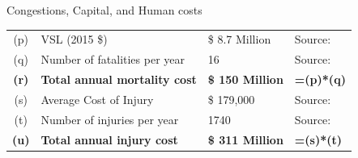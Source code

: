 \documentclass{beamer}
\begin{document}
\begin{frame}
\begin{block}{Congestions, Capital, and Human costs}
\begin{table}[h]
\begin{tabular}{c l l l}
(p)	& VSL (2015 \$)						& \$ 8.7 Million			& Source:	\cite{EIA:guidelines}		\\
(q)	& Number of fatalities per year				& 16					& Source: \cite{nyctransit}	\\
\textbf{(r)}	& \textbf{Total annual mortality cost}	& \textbf{\$ 150 Million}	& \textbf{=(p)*(q)}			\\
(s)	& Average Cost of Injury 					& \$ 179,000			& Source:	\cite{CDC} 	\\
(t)	& Number of injuries per year				& 1740				& Source:	\cite{nyctransit}	\\
\textbf{(u)}	& \textbf{Total annual injury cost}	& \textbf{\$ 311 Million}		& \textbf{=(s)*(t)}
\\\hline\hline
\end{tabular}
\end{table}%
\end{block}
\end{frame}
\end{document}
